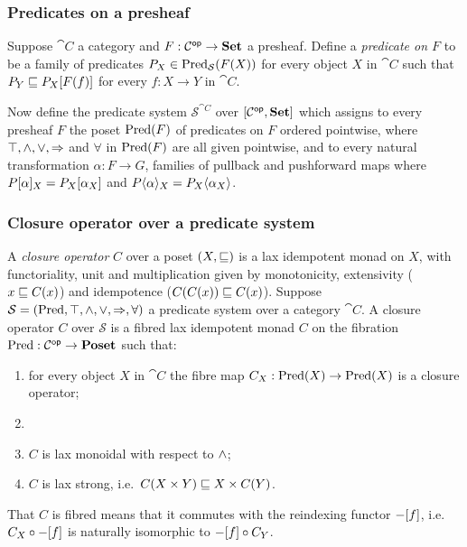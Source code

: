 \subsubsection{Predicates on a presheaf}

Suppose $\cat{C}$ a category and $F: \mathcal{C}^{\mathsf{op}} \to \mathbf{Set}$ a presheaf. Define a \emph{predicate on $F$} to be
a family of predicates $P_X \in \mathrm{Pred}_\mathcal{S}(F(X))$ for every object $X$ in $\cat{C}$ such that $P_Y
\sqsubseteq P_X[F(f)]$ for every $f: X \to Y$ in $\cat{C}$.

Now define the predicate system $\mathcal{S}^{\cat{C}}$ over $[\mathcal{C}^{\mathsf{op}},\mathbf{Set}]$ which assigns to every
presheaf $F$ the poset $\mathrm{Pred}(F)$ of predicates on $F$ ordered pointwise, where $\top, \wedge, \vee,
\Rightarrow$ and $\forall$ in $\mathrm{Pred}(F)$ are all given pointwise, and to every natural transformation $\alpha: F
\to G$, families of pullback and pushforward maps where $P[\alpha]_X = P_X[\alpha_X]$ and
$P\langle\alpha\rangle_X = P_X\langle\alpha_X\rangle$.

\subsubsection{Closure operator over a predicate system}

A \emph{closure operator} $C$ over a poset $(X, \sqsubseteq)$ is a lax idempotent monad on $X$, with functoriality,
unit and multiplication given by monotonicity, extensivity ($x \sqsubseteq C(x)$) and idempotence ($C(C(x)) \sqsubseteq
C(x)$). Suppose $\mathcal{S} = (\mathrm{Pred}, \top, \wedge, \vee, \Rightarrow, \forall)$ a predicate system over a
category $\cat{C}$. A closure operator $C$ over $\mathcal{S}$ is a fibred lax idempotent monad $C$ on the
fibration $\mathrm{Pred}: \mathcal{C}^{\mathsf{op}} \to \mathbf{Poset}$ such that:
\begin{enumerate}
\item for every object $X$ in $\cat{C}$ the fibre map $C_X: \mathrm{Pred}(X) \to \mathrm{Pred}(X)$ is a closure operator;
\item
\item $C$ is lax monoidal with respect to $\wedge$;
\item $C$ is lax strong, i.e.~$C(X \times Y) \sqsubseteq X \times C(Y)$.
\end{enumerate}
That $C$ is fibred means that it commutes with the reindexing functor $-[f]$, i.e.~$C_X \circ
-[f]$ is naturally isomorphic to $-[f] \circ C_Y$.
